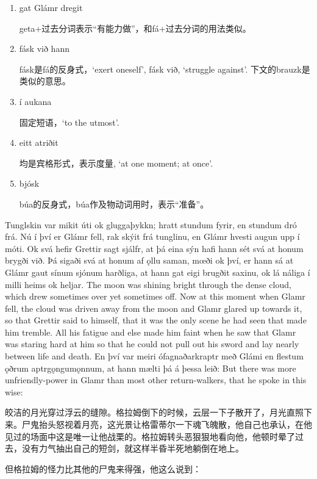 \begin{grammar*}{}
  \begin{enumerate}[leftmargin=*]
    \item gat Glámr dregit

          geta+过去分词表示“有能力做”，和fá+过去分词的用法类似。

    \item fásk við hann

          fásk是fá的反身式，`exert oneself', fásk við, `struggle against'. 下文的brauzk是类似的意思。

    \item í aukana

          固定短语，`to the utmost'.

    \item eitt atriðit

          均是宾格形式，表示度量, `at one moment; at once'.

    \item bjósk

          búa的反身式，búa作及物动词用时，表示“准备”。
  \end{enumerate}
\end{grammar*}
\begin{paracol}{2}
  Tunglskin var mikit úti ok gluggaþykkn; hratt stundum fyrir, en stundum dró frá. Nú í því er Glámr fell, rak skýit frá tunglinu, en Glámr hvesti augun upp í móti. Ok svá hefir Grettir sagt sjálfr, at þá eina sýn hafi hann sét svá at honum brygði við. Þá sigaði svá at honum af ǫllu saman, mœði ok því, er hann sá at Glámr gaut sínum sjónum harðliga, at hann gat eigi brugðit saxinu, ok lá náliga í milli heims ok heljar.
  \switchcolumn
  The moon was shining bright through the dense cloud, which drew sometimes over yet sometimes off. Now at this moment when Glamr fell, the cloud was driven away from the moon and Glamr glared up towards it, so that Grettir said to himself, that it was the only scene he had seen that made him tremble. All his fatigue and else made him faint when he saw that Glamr was staring hard at him so that he could not pull out his sword and lay nearly between life and death.
  \switchcolumn
  En því var meiri ófagnaðarkraptr með Glámi en flestum ǫðrum aptrgǫngumǫnnum, at hann mælti þá á þessa leið:
  \switchcolumn
  But there was more unfriendly-power in Glamr than most other return-walkers, that he spoke in this wise:
\end{paracol}
\begin{translation*}{}
  皎洁的月光穿过浮云的缝隙。格拉姆倒下的时候，云层一下子散开了，月光直照下来。尸鬼抬头怒视着月亮，这光景让格雷蒂尔一下魂飞魄散，他自己也承认，在他见过的场面中这是唯一让他战栗的。格拉姆转头恶狠狠地看向他，他顿时晕了过去，没有力气抽出自己的短剑，就这样半昏半死地躺倒在地上。

  但格拉姆的怪力比其他的尸鬼来得强，他这么说到：
\end{translation*}
